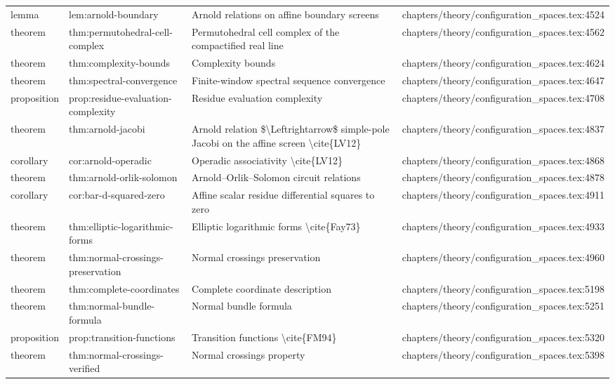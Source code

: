 \documentclass[11pt]{article}
\begin{document}
\begin{longtable}{L{0.10\textwidth}L{0.26\textwidth}L{0.42\textwidth}L{0.22\textwidth}}
lemma & lem:arnold-boundary & Arnold relations on affine boundary screens & chapters/theory/configuration\_spaces.tex:4524\\
theorem & thm:permutohedral-cell-complex & Permutohedral cell complex of the compactified real line & chapters/theory/configuration\_spaces.tex:4562\\
theorem & thm:complexity-bounds & Complexity bounds & chapters/theory/configuration\_spaces.tex:4624\\
theorem & thm:spectral-convergence & Finite-window spectral sequence convergence & chapters/theory/configuration\_spaces.tex:4647\\
proposition & prop:residue-evaluation-complexity & Residue evaluation complexity & chapters/theory/configuration\_spaces.tex:4708\\
theorem & thm:arnold-jacobi & Arnold relation \$\textbackslash{}Leftrightarrow\$ simple-pole Jacobi on the affine screen \textbackslash{}cite\{LV12\} & chapters/theory/configuration\_spaces.tex:4837\\
corollary & cor:arnold-operadic & Operadic associativity \textbackslash{}cite\{LV12\} & chapters/theory/configuration\_spaces.tex:4868\\
theorem & thm:arnold-orlik-solomon & Arnold--Orlik--Solomon circuit relations & chapters/theory/configuration\_spaces.tex:4878\\
corollary & cor:bar-d-squared-zero & Affine scalar residue differential squares to zero & chapters/theory/configuration\_spaces.tex:4911\\
theorem & thm:elliptic-logarithmic-forms & Elliptic logarithmic forms \textbackslash{}cite\{Fay73\} & chapters/theory/configuration\_spaces.tex:4933\\
theorem & thm:normal-crossings-preservation & Normal crossings preservation & chapters/theory/configuration\_spaces.tex:4960\\
theorem & thm:complete-coordinates & Complete coordinate description & chapters/theory/configuration\_spaces.tex:5198\\
theorem & thm:normal-bundle-formula & Normal bundle formula & chapters/theory/configuration\_spaces.tex:5251\\
proposition & prop:transition-functions & Transition functions \textbackslash{}cite\{FM94\} & chapters/theory/configuration\_spaces.tex:5320\\
theorem & thm:normal-crossings-verified & Normal crossings property & chapters/theory/configuration\_spaces.tex:5398\\

\end{longtable}
\end{document}
